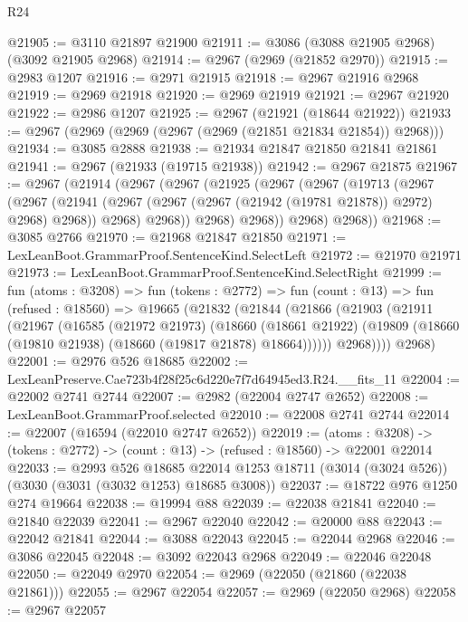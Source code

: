 \begin{lexlean}{R24}
\begin{coremodule}
@21905 := @3110 @21897 @21900
@21911 := @3086 (@3088 @21905 @2968) (@3092 @21905 @2968)
@21914 := @2967 (@2969 (@21852 @2970))
@21915 := @2983 @1207
@21916 := @2971 @21915
@21918 := @2967 @21916 @2968
@21919 := @2969 @21918
@21920 := @2969 @21919
@21921 := @2967 @21920
@21922 := @2986 @1207
@21925 := @2967 (@21921 (@18644 @21922))
@21933 := @2967 (@2969 (@2969 (@2967 (@2969 (@21851 @21834 @21854)) @2968)))
@21934 := @3085 @2888
@21938 := @21934 @21847 @21850 @21841 @21861
@21941 := @2967 (@21933 (@19715 @21938))
@21942 := @2967 @21875
@21967 := @2967
    (@21914
      (@2967
        (@2967
          (@21925
            (@2967
              (@2967
                (@19713
                  (@2967
                    (@2967
                      (@21941 (@2967 (@2967 (@2967 (@21942 (@19781 @21878)) @2972) @2968) @2968))
                      @2968)
                    @2968))
                @2968)
              @2968))
          @2968)
        @2968))
@21968 := @3085 @2766
@21970 := @21968 @21847 @21850
@21971 := LexLeanBoot.GrammarProof.SentenceKind.SelectLeft
@21972 := @21970 @21971
@21973 := LexLeanBoot.GrammarProof.SentenceKind.SelectRight
@21999 := fun (atoms : @3208) =>
  fun (tokens : @2772) =>
  fun (count : @13) =>
  fun (refused : @18560) =>
  @19665
    (@21832
      (@21844
        (@21866
          (@21903
            (@21911
              (@21967
                (@16585
                  (@21972 @21973)
                  (@18660
                    (@18661 @21922)
                    (@19809 (@18660 (@19810 @21938) (@18660 (@19817 @21878) @18664))))))
              @2968))))
      @2968)
@22001 := @2976 @526 @18685
@22002 := LexLeanPreserve.Cae723b4f28f25c6d220e7f7d64945ed3.R24.__fits_11
@22004 := @22002 @2741 @2744
@22007 := @2982 (@22004 @2747 @2652)
@22008 := LexLeanBoot.GrammarProof.selected
@22010 := @22008 @2741 @2744
@22014 := @22007 (@16594 (@22010 @2747 @2652))
@22019 := (atoms : @3208) ->
  (tokens : @2772) -> (count : @13) -> (refused : @18560) -> @22001 @22014
@22033 := @2993
    @526
    @18685
    @22014
    @1253
    @18711
    (@3014 (@3024 @526))
    (@3030 (@3031 (@3032 @1253) @18685 @3008))
@22037 := @18722 @976 @1250 @274 @19664
@22038 := @19994 @88
@22039 := @22038 @21841
@22040 := @21840 @22039
@22041 := @2967 @22040
@22042 := @20000 @88
@22043 := @22042 @21841
@22044 := @3088 @22043
@22045 := @22044 @2968
@22046 := @3086 @22045
@22048 := @3092 @22043 @2968
@22049 := @22046 @22048
@22050 := @22049 @2970
@22054 := @2969 (@22050 (@21860 (@22038 @21861)))
@22055 := @2967 @22054
@22057 := @2969 (@22050 @2968)
@22058 := @2967 @22057

\end{coremodule}
\end{lexlean}
